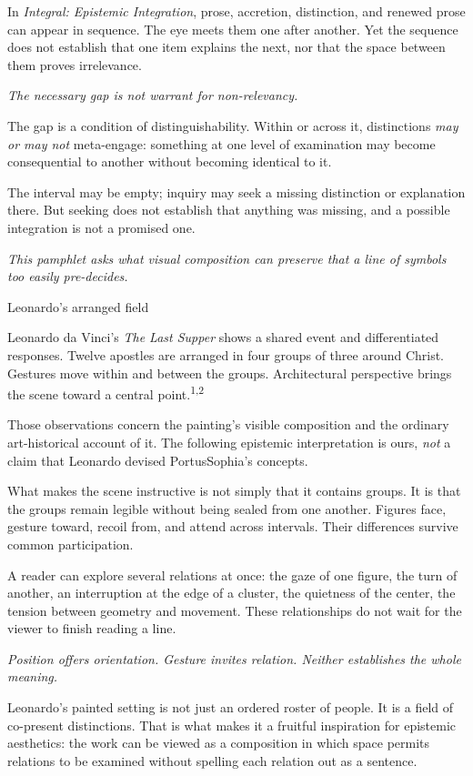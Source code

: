 \documentclass[11pt]{article}
\newcommand{\kicker}[1]{\vspace*{.10in}{\sffamily\fontsize{8.5}{10.5}\selectfont\color{gold}\MakeUppercase{#1}}\par\vspace{.12in}}
\newcommand{\sectitle}[1]{{\fontsize{20}{22}\selectfont\color{deep}#1\par}\vspace{.12in}}
\newcommand{\qline}[1]{\begin{center}\begin{minipage}{.88\linewidth}\centering\color{deep}\fontsize{14}{17}\selectfont\itshape #1\end{minipage}\end{center}}
\newcommand{\breakpage}{\clearpage}
\begin{document}
In \textit{Integral: Epistemic Integration}, prose, accretion, distinction, and renewed prose can appear in sequence. The eye meets them one after another. Yet the sequence does not establish that one item explains the next, nor that the space between them proves irrelevance.

\vspace{.08in}
\qline{The necessary gap is not warrant for non-relevancy.}
\vspace{.04in}
The gap is a condition of distinguishability. Within or across it, distinctions \textit{may or may not} meta-engage: something at one level of examination may become consequential to another without becoming identical to it.

The interval may be empty; inquiry may seek a missing distinction or explanation there. But seeking does not establish that anything was missing, and a possible integration is not a promised one.

\vfill
{\color{sea}\fontsize{11}{14}\selectfont\itshape This pamphlet asks what visual composition can preserve that a line of symbols too easily pre-decides.\par}
\breakpage
\kicker{02 / The encounter}
\sectitle{Leonardo's arranged field}
Leonardo da Vinci's \textit{The Last Supper} shows a shared event and differentiated responses. Twelve apostles are arranged in four groups of three around Christ. Gestures move within and between the groups. Architectural perspective brings the scene toward a central point.\textsuperscript{1,2}

Those observations concern the painting's visible composition and the ordinary art-historical account of it. The following epistemic interpretation is ours, \textit{not} a claim that Leonardo devised PortusSophia's concepts.

What makes the scene instructive is not simply that it contains groups. It is that the groups remain legible without being sealed from one another. Figures face, gesture toward, recoil from, and attend across intervals. Their differences survive common participation.

A reader can explore several relations at once: the gaze of one figure, the turn of another, an interruption at the edge of a cluster, the quietness of the center, the tension between geometry and movement. These relationships do not wait for the viewer to finish reading a line.

\vspace{.08in}
\qline{Position offers orientation. Gesture invites relation. Neither establishes the whole meaning.}
\vspace{.06in}
Leonardo's painted setting is not just an ordered roster of people. It is a field of co-present distinctions. That is what makes it a fruitful inspiration for epistemic aesthetics: the work can be viewed as a composition in which space permits relations to be examined without spelling each relation out as a sentence.
\end{document}
